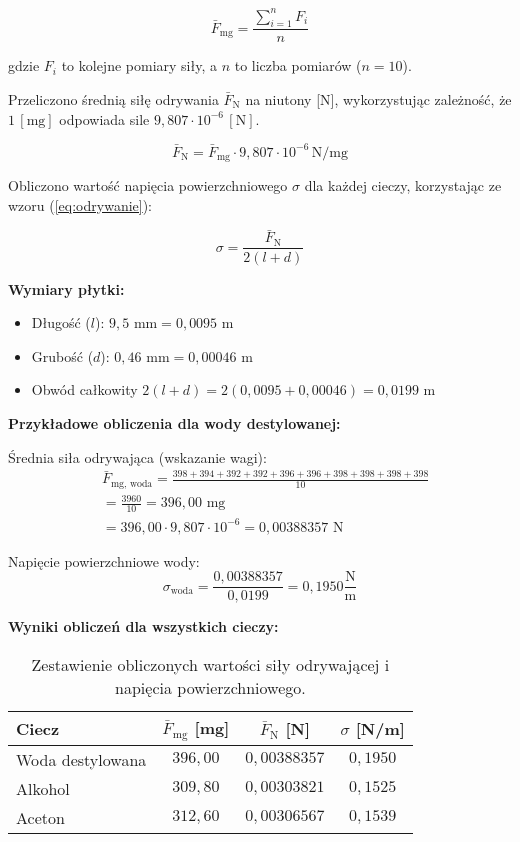 \documentclass[a4paper,12pt]{article}
\begin{document}
$$
    \bar{F}_{\text{mg}} = \frac{\sum_{i=1}^{n} F_i}{n}
$$

gdzie $F_i$ to kolejne pomiary siły, a $n$ to liczba pomiarów ($n=10$).

Przeliczono średnią siłę odrywania $\bar{F}_{\text{N}}$ na niutony [N], wykorzystując zależność, że $1 \, [\text{mg}]$ odpowiada sile $9{,}807 \cdot 10^{-6} \, [\text{N}]$.

$$
    \bar{F}_{\text{N}} = \bar{F}_{\text{mg}} \cdot 9{,}807 \cdot 10^{-6} \, \text{N/mg}
$$

Obliczono wartość napięcia powierzchniowego $\sigma$ dla każdej cieczy, korzystając ze wzoru (\ref{eq:odrywanie}):

$$
    \sigma = \frac{\bar{F}_{\text{N}}}{2(l+d)}
$$

\noindent\textbf{Wymiary płytki:}
\begin{itemize}
    \item Długość ($l$): $9{,}5 \text{ mm} = 0{,}0095 \text{ m}$
    \item Grubość ($d$): $0{,}46 \text{ mm} = 0{,}00046 \text{ m}$
    \item Obwód całkowity $2(l+d) = 2(0{,}0095 + 0{,}00046) = 0{,}0199 \text{ m}$
\end{itemize}

\noindent\textbf{Przykładowe obliczenia dla wody destylowanej:}

Średnia siła odrywająca (wskazanie wagi):
\begin{align*}
     & \bar{F}_{\text{mg, woda}} = \frac{398+394+392+392+396+396+398+398+398+398}{10} \\
     & = \frac{3960}{10} = 396{,}00 \text{ mg}                                        \\
     & = 396{,}00 \cdot 9{,}807 \cdot 10^{-6} = 0{,}00388357 \text{ N}
\end{align*}

Napięcie powierzchniowe wody:
$$
    \sigma_{\text{woda}} = \frac{0{,}00388357}{0{,}0199} = 0{,}1950 \frac{\text{N}}{\text{m}}
$$

\noindent\textbf{Wyniki obliczeń dla wszystkich cieczy:}

\begin{table}[H]
    \centering
    \begin{tabular}{|l|c|c|c|}
        \hline
        \textbf{Ciecz} & \textbf{$\bar{F}_{\text{mg}}$ [mg]} & \textbf{$\bar{F}_{\text{N}}$ [N]} & \textbf{$\sigma$ [N/m]} \\
        \hline
        Woda destylowana & $396{,}00$ & $0{,}00388357$ & $0{,}1950$ \\
        \hline
        Alkohol & $309{,}80$ & $0{,}00303821$ & $0{,}1525$ \\
        \hline
        Aceton & $312{,}60$ & $0{,}00306567$ & $0{,}1539$ \\
        \hline
    \end{tabular}
    \caption{Zestawienie obliczonych wartości siły odrywającej i napięcia powierzchniowego.}
    \label{tab:wyniki_obliczen_odrywanie}
\end{table}
\end{document}
